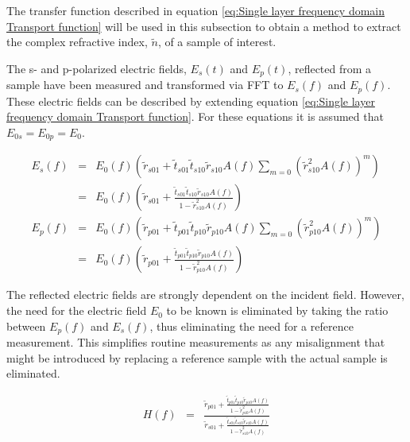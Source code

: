 The transfer function described in equation \ref{eq:Single layer frequency domain Transport function} will be used in this subsection to obtain a method to extract the complex refractive index, $\widetilde{n}$, of a sample of interest.

The s- and p-polarized electric fields, $E_{s}(t)$ and $E_{p}(t)$, reflected from a sample have been measured and transformed via FFT to $E_{s}(f)$ and $E_{p}(f)$. These electric fields can be described by extending equation \ref{eq:Single layer frequency domain Transport function}. For these equations it is assumed that $E_{0 s} = E_{0 p} = E_{0}$.

\begin{eqnarray}
E_{s}(f) &=& E_{0}(f)(\widetilde{r}_{s01} + \widetilde{t}_{s01}\widetilde{t}_{s10}\widetilde{r}_{s10}A(f)\sum_{m=0}(\widetilde{r}_{s10}^{2}A(f))^{m})\nonumber\\
&=& E_{0}(f)\left(\widetilde{r}_{s01} + \frac{\widetilde{t}_{s01}\widetilde{t}_{s10}\widetilde{r}_{s10}A(f)}{1 - \widetilde{r}_{s10}^{2}A(f)}\right)\label{eq:Single layer frequency domain Transport function s-polarization}\\
E_{p}(f) &=& E_{0}(f)(\widetilde{r}_{p01} + \widetilde{t}_{p01}\widetilde{t}_{p10}\widetilde{r}_{p10}A(f)\sum_{m=0}(\widetilde{r}_{p10}^{2}A(f))^{m})\nonumber\\
&=& E_{0}(f)\left(\widetilde{r}_{p01} + \frac{\widetilde{t}_{p01}\widetilde{t}_{p10}\widetilde{r}_{p10}A(f)}{1 - \widetilde{r}_{p10}^{2}A(f)}\right)\label{eq:Single layer frequency domain Transport function p-polarization}
\end{eqnarray}

The reflected electric fields are strongly dependent on the incident field. However, the need for the electric field $E_{0}$ to be known is eliminated by taking the ratio between $E_{p}(f)$ and $E_{s}(f)$, thus eliminating the need for a reference measurement. This simplifies routine measurements as any misalignment that might be introduced by replacing a reference sample with the actual sample is eliminated.

\begin{eqnarray}
H(f) &=&  \frac{\widetilde{r}_{p01} + \frac{\widetilde{t}_{p01}\widetilde{t}_{p10}\widetilde{r}_{p10}A(f)}{1 - \widetilde{r}_{p10}^{2}A(f)}}{\widetilde{r}_{s01} + \frac{\widetilde{t}_{s01}\widetilde{t}_{s10}\widetilde{r}_{s10}A(f)}{1 - \widetilde{r}_{s10}^{2}A(f)}}
\label{eq:Transfer Ratio}
\end{eqnarray}

